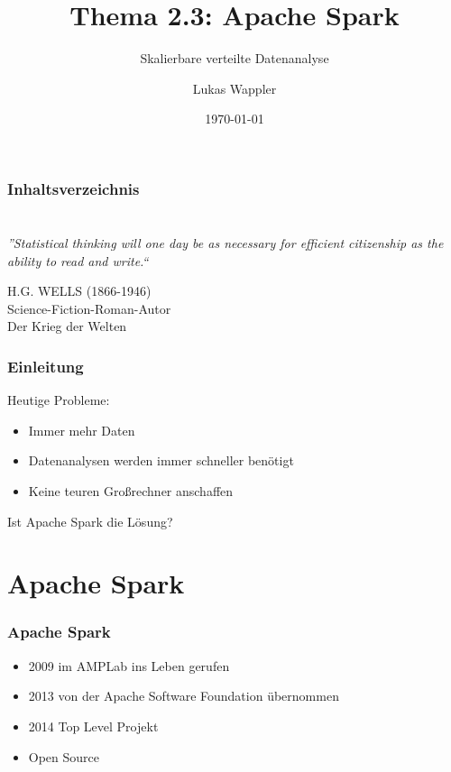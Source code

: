\documentclass[hyperref={pdfpagelabels=false}]{beamer}
\title{Thema 2.3: Apache Spark}
\subtitle{Skalierbare verteilte Datenanalyse}
\author{Lukas Wappler}
\date{\today}
\begin{document}
\begin{frame}
\titlepage
\end{frame} 


\begin{frame}
\frametitle{Inhaltsverzeichnis}
\setcounter{tocdepth}{1}
\tableofcontents
\end{frame} 





\section{} 
\begin{frame}
\frametitle{} 
\begin{center}
\textit{\LARGE{”Statistical thinking will one day be as necessary for efficient citizenship as the ability to read and write.“}}
\end{center}
\vspace{0.5cm} 
\begin{flushright}
\footnotesize{H.G. WELLS (1866-1946)\\ Science-Fiction-Roman-Autor\\ Der Krieg der Welten}
\end{flushright}

\end{frame}


\begin{frame}[t]
\frametitle{Einleitung} 

Heutige Probleme:
\begin{itemize}
\item  Immer mehr Daten 
\item  Datenanalysen werden immer schneller benötigt
\item  Keine teuren Großrechner anschaffen
\end{itemize}  


 { \huge{Ist Apache Spark die Lösung?}  }

\end{frame}

\section{Apache Spark} 
\begin{frame} [t]
\frametitle{Apache Spark} 


\begin{itemize}
	\item 2009 im AMPLab ins Leben gerufen
	\item 2013 von der Apache Software Foundation übernommen
	\item 2014 Top Level Projekt	
	\item Open Source	
\end{itemize}

\end{frame}
\end{document}
